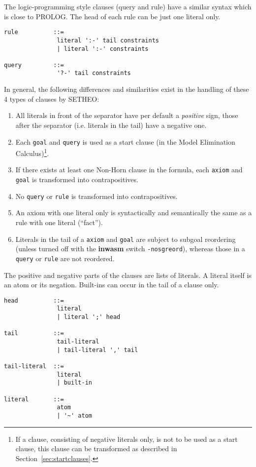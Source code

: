 The logic-programming style clauses (query and rule) have a
similar syntax which is close to PROLOG. The head of each rule
can be just one literal only.
\begin{verbatim}
rule          ::=
               literal ':-' tail constraints
               | literal ':-' constraints

query         ::=
               '?-' tail constraints
\end{verbatim}


In general, the following differences and similarities
exist in the handling of these 4 types of clauses by SETHEO:
\begin{enumerate}
\item
All literals in front of the separator have per default
a {\em positive\/} sign, those after the separator (i.e. literals
in the tail) have a negative one.
\item
Each {\tt goal} and {\tt query} is used as a start clause 
(in the Model Elimination Calculus)\footnote{
	If a clause, consisting of negative literals only, is not
	to be used as a start clause, this clause can be transformed
	as described in Section~\ref{sec:startclauses}.
	}.
\item
If there exists at least one Non-Horn clause in the formula, each
{\tt axiom} and {\tt goal} is transformed into contrapositives.
\item
No {\tt query} or {\tt rule} is transformed into contrapositives.
\item
An axiom with one literal only is syntactically and semantically
the same as a rule with one literal (``fact'').
\item
Literals in the tail of a
{\tt axiom} and {\tt goal} are subject to subgoal reordering
(unless turned off with the {\bf inwasm} switch {\tt -nosgreord}),
whereas those in a
{\tt query} or  {\tt rule} are not reordered.
\end{enumerate}


The positive and negative parts of the clauses are lists
of literals. A literal itself is an atom or its negation.
Built-ins can occur in the tail of a clause only.
\begin{verbatim}
head          ::=
               literal
               | literal ';' head

tail          ::=
               tail-literal
               | tail-literal ',' tail

tail-literal  ::=
               literal
               | built-in

literal       ::=
               atom
               | '~' atom
\end{verbatim}

